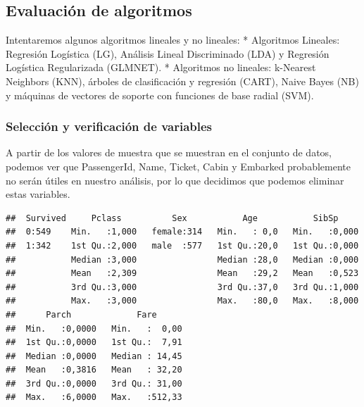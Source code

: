 \documentclass[]{article}
\newenvironment{Shaded}{\begin{snugshade}}{\end{snugshade}}
\newcommand{\KeywordTok}[1]{\textcolor[rgb]{0.13,0.29,0.53}{\textbf{#1}}}
\newcommand{\DecValTok}[1]{\textcolor[rgb]{0.00,0.00,0.81}{#1}}
\newcommand{\StringTok}[1]{\textcolor[rgb]{0.31,0.60,0.02}{#1}}
\newcommand{\CommentTok}[1]{\textcolor[rgb]{0.56,0.35,0.01}{\textit{#1}}}
\newcommand{\OperatorTok}[1]{\textcolor[rgb]{0.81,0.36,0.00}{\textbf{#1}}}
\newcommand{\NormalTok}[1]{#1}
\begin{document}
\subsection{Evaluación de algoritmos}\label{evaluacion-de-algoritmos}

Intentaremos algunos algoritmos lineales y no lineales: * Algoritmos
Lineales: Regresión Logística (LG), Análisis Lineal Discriminado (LDA) y
Regresión Logística Regularizada (GLMNET). * Algoritmos no lineales:
k-Nearest Neighbors (KNN), árboles de clasificación y regresión (CART),
Naive Bayes (NB) y máquinas de vectores de soporte con funciones de base
radial (SVM).

\subsubsection{Selección y verificación de
variables}\label{seleccion-y-verificacion-de-variables}

A partir de los valores de muestra que se muestran en el conjunto de
datos, podemos ver que PassengerId, Name, Ticket, Cabin y Embarked
probablemente no serán útiles en nuestro análisis, por lo que decidimos
que podemos eliminar estas variables.

\begin{Shaded}
\end{Shaded}

\begin{verbatim}
##  Survived     Pclass          Sex           Age           SibSp      
##  0:549    Min.   :1,000   female:314   Min.   : 0,0   Min.   :0,000  
##  1:342    1st Qu.:2,000   male  :577   1st Qu.:20,0   1st Qu.:0,000  
##           Median :3,000                Median :28,0   Median :0,000  
##           Mean   :2,309                Mean   :29,2   Mean   :0,523  
##           3rd Qu.:3,000                3rd Qu.:37,0   3rd Qu.:1,000  
##           Max.   :3,000                Max.   :80,0   Max.   :8,000  
##      Parch             Fare       
##  Min.   :0,0000   Min.   :  0,00  
##  1st Qu.:0,0000   1st Qu.:  7,91  
##  Median :0,0000   Median : 14,45  
##  Mean   :0,3816   Mean   : 32,20  
##  3rd Qu.:0,0000   3rd Qu.: 31,00  
##  Max.   :6,0000   Max.   :512,33
\end{verbatim}
\end{document}
